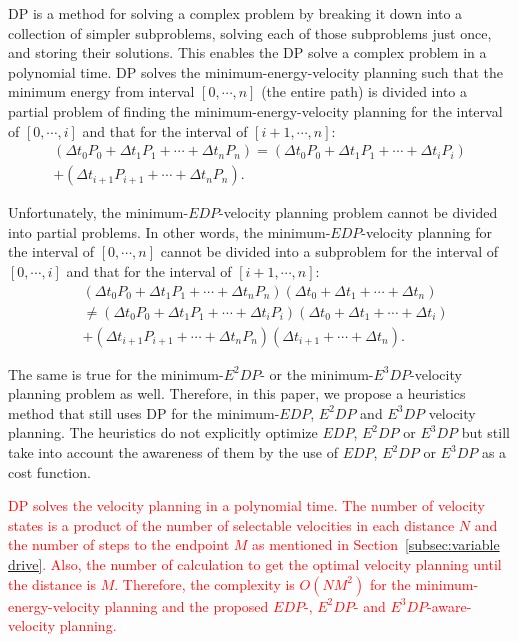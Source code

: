 \documentclass{IEEEtran}
\begin{document}
DP is a method for solving a complex problem by breaking it down into a collection of simpler subproblems, solving each of those subproblems just once, and storing their solutions. This enables the DP solve a complex problem in a polynomial time. DP solves the minimum-energy-velocity planning such that the minimum energy from interval $[0,\cdots,n]$ (the entire path) is divided into a partial problem of finding the minimum-energy-velocity planning for the interval of $[0, \cdots, i]$ and that for the interval of  $[i+1, \cdots, n]$:
%
\begin{align}
 (\Delta t_0 P_0 + \Delta t_1 P_1 + \cdots + \Delta t_n P_n)
 = (\Delta t_0 P_0 + \Delta t_1 P_1 + \cdots + \Delta t_i P_i) \nonumber \\
 + (\Delta t_{i+1} P_{i+1} + \cdots + \Delta t_n P_n).
\end{align}

Unfortunately, the minimum-$EDP$-velocity planning problem cannot be divided into partial problems. In other words, the minimum-$EDP$-velocity planning for the interval of $[0, \cdots, n]$ cannot be divided into a subproblem for the interval of $[0, \cdots,  i]$ and that for the interval of $[i+1,\cdots, n]$:
%
\begin{align}
&(\Delta t_0 P_0 + \Delta t_1 P_1 + \cdots + \Delta t_n P_n)(\Delta t_0 + \Delta t_1 + \cdots + \Delta t_n) \nonumber \\ 
&\neq (\Delta t_0 P_0 + \Delta t_1 P_1 + \cdots + \Delta t_i P_i)(\Delta t_0 + \Delta t_1 + \cdots + \Delta t_i) \nonumber \\
&+ (\Delta t_{i+1} P_{i+1} + \cdots + \Delta t_n P_n)(\Delta t_{i+1} + \cdots + \Delta t_n).
\end{align} 

The same is true for the minimum-$E^2DP$- or the minimum-$E^3DP$-velocity planning problem as well. Therefore, in this paper, we propose a heuristics method that still uses DP for the minimum-$EDP$, $E^2DP$ and $E^3DP$ velocity planning. The heuristics do not explicitly optimize $EDP$, $E^2DP$ or $E^3DP$ but still take into account the awareness of them by the use of $EDP$, $E^2DP$ or $E^3DP$ as a cost function. 

\textcolor{red}{DP solves the velocity planning in a polynomial time. The number of velocity states is a product of the number of selectable velocities in each distance $N$ and the number of steps to the endpoint $M$ as mentioned in Section~\ref{subsec:variable drive}. Also, the number of calculation to get the optimal velocity planning until the distance is $M$. Therefore, the complexity is $O(NM^2)$ for the minimum-energy-velocity planning and the proposed $EDP$-, $E^2DP$- and $E^3DP$-aware-velocity planning.} 
\end{document}
